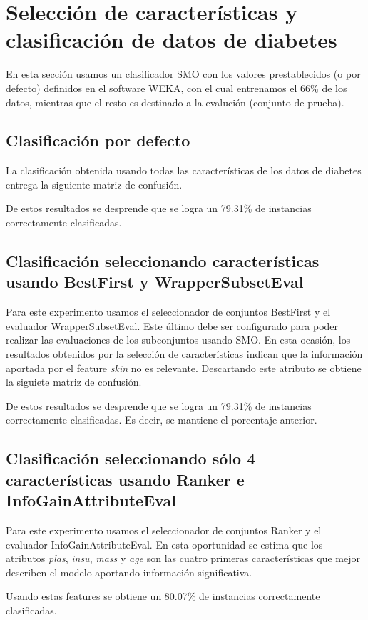 \section{Selecci\'on de caracter\'isticas y clasificaci\'on de datos de diabetes}\label{sec3}

En esta secci\'on usamos un clasificador SMO con los valores prestablecidos (o por defecto) definidos en el software WEKA, con el cual entrenamos el 66\% de los datos, mientras que el resto es destinado a la evaluci\'on (conjunto de prueba).

\subsection{Clasificaci\'on por defecto}
La clasificaci\'on obtenida usando todas las caracter\'isticas de los datos de diabetes entrega la siguiente matriz de confusi\'on.
\begin{center}

\end{center}

De estos resultados se desprende que se logra un 79.31\% de instancias correctamente clasificadas. 
\subsection{Clasificaci\'on seleccionando caracter\'isticas usando BestFirst y WrapperSubsetEval}
Para este experimento usamos el seleccionador de conjuntos BestFirst y el evaluador WrapperSubsetEval. Este \'ultimo debe ser configurado para poder realizar las evaluaciones de los  subconjuntos usando SMO. En esta ocasi\'on, los resultados obtenidos por la selecci\'on de caracter\'isticas indican que la informaci\'on aportada por el feature \textit{skin} no es relevante. Descartando este atributo se obtiene la siguiete matriz de confusi\'on. 
\begin{center}

\end{center}
De estos resultados se desprende que se logra un 79.31\% de instancias correctamente clasificadas. Es decir, se mantiene el porcentaje anterior.
\subsection{Clasificaci\'on seleccionando s\'olo 4 caracter\'isticas usando Ranker e InfoGainAttributeEval}
Para este experimento usamos el seleccionador de conjuntos Ranker y el evaluador InfoGainAttributeEval.  En esta oportunidad se estima que los atributos \textit{plas}, \textit{insu}, \textit{mass} y \textit{age}  son las cuatro primeras caracter\'isticas que mejor  describen el modelo aportando informaci\'on significativa.
\begin{center}

\end{center}
Usando estas features se obtiene un 80.07\% de instancias correctamente clasificadas.
